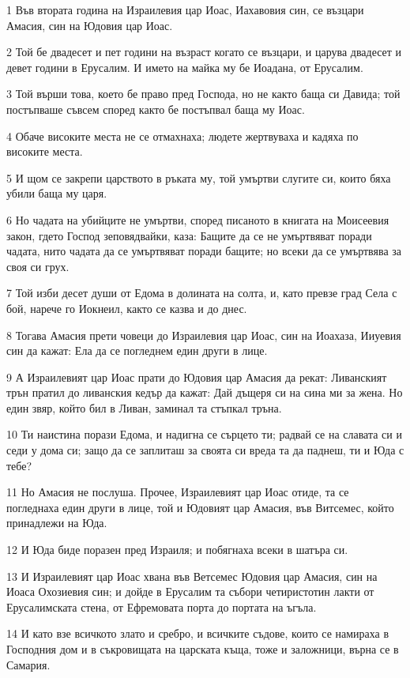 \par 1 Във втората година на Израилевия цар Иоас, Иахавовия син, се възцари Амасия, син на Юдовия цар Иоас.
\par 2 Той бе двадесет и пет години на възраст когато се възцари, и царува двадесет и девет години в Ерусалим. И името на майка му бе Иоадана, от Ерусалим.
\par 3 Той върши това, което бе право пред Господа, но не както баща си Давида; той постъпваше съвсем според както бе постъпвал баща му Иоас.
\par 4 Обаче високите места не се отмахнаха; людете жертвуваха и кадяха по високите места.
\par 5 И щом се закрепи царството в ръката му, той умъртви слугите си, които бяха убили баща му царя.
\par 6 Но чадата на убийците не умъртви, според писаното в книгата на Моисеевия закон, гдето Господ зеповядвайки, каза: Бащите да се не умъртвяват поради чадата, нито чадата да се умъртвяват поради бащите; но всеки да се умъртвява за своя си грух.
\par 7 Той изби десет души от Едома в долината на солта, и, като превзе град Села с бой, нарече го Иокнеил, както се казва и до днес.
\par 8 Тогава Амасия прети човеци до Израилевия цар Иоас, син на Иоахаза, Ииуевия син да кажат: Ела да се погледнем един други в лице.
\par 9 А Израилевият цар Иоас прати до Юдовия цар Амасия да рекат: Ливанският трън пратил до ливанския кедър да кажат: Дай дъщеря си на сина ми за жена. Но един звяр, който бил в Ливан, заминал та стъпкал тръна.
\par 10 Ти наистина порази Едома, и надигна се сърцето ти; радвай се на славата си и седи у дома си; защо да се заплиташ за своята си вреда та да паднеш, ти и Юда с тебе?
\par 11 Но Амасия не послуша. Прочее, Израилевият цар Иоас отиде, та се погледнаха един други в лице, той и Юдовият цар Амасия, във Витсемес, който принадлежи на Юда.
\par 12 И Юда биде поразен пред Израиля; и побягнаха всеки в шатъра си.
\par 13 И Израилевият цар Иоас хвана във Ветсемес Юдовия цар Амасия, син на Иоаса Охозиевия син; и дойде в Ерусалим та събори четиристотин лакти от Ерусалимската стена, от Ефремовата порта до портата на ъгъла.
\par 14 И като взе всичкото злато и сребро, и всичките съдове, които се намираха в Господния дом и в съкровищата на царската къща, тоже и заложници, върна се в Самария.
